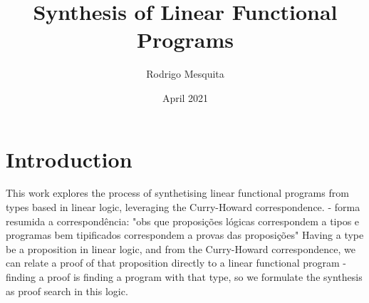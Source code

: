 \documentclass{llncs}
\title{Synthesis of Linear Functional Programs}
\author{Rodrigo Mesquita}
\date{April 2021}
\institute{NOVA School of Science and Technology}
\begin{document}
\maketitle

\section{Introduction}

This work explores the process of synthetising linear functional
programs from types based in linear logic, leveraging the Curry-Howard
correspondence.  - forma resumida a correspondência: "obs que
proposições lógicas correspondem a tipos e programas bem tipificados
correspondem a provas das proposições" Having a type be a proposition
in linear logic, and from the Curry-Howard correspondence, we can
relate a proof of that proposition directly to a linear functional
program - finding a proof is finding a program with that type, so we
formulate the synthesis as proof search in this logic.
\end{document}
